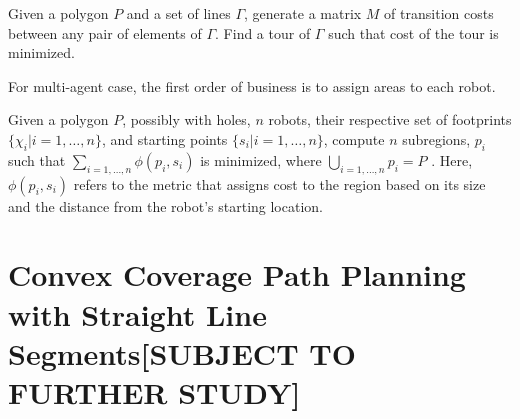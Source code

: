 \documentclass[../main.tex]{subfiles}
\begin{document}
\begin{problem}
\label{prob:min_tour}
	
Given a polygon $P$ and a set of lines $\Gamma$, generate a matrix $M$ of transition costs between any pair of elements of $\Gamma$. Find a tour of $\Gamma$ such that cost of the tour is minimized.
\end{problem}


For multi-agent case, the first order of business is to assign areas to each robot.
\begin{problem}
\label{prb:distr_cpp_2}

Given a polygon $P$, possibly with holes, $n$ robots, their respective set of footprints $\{\chi_i|i=1,\ldots,n\}$, and starting points $\{s_i|i=1,\ldots,n\}$, compute $n$ subregions, $p_i$ such that $\sum_{i=1,\ldots,n}\phi(p_i,s_i)$ is minimized, where $\bigcup_{i=1,\ldots,n} p_i=P$ . Here, $\phi(p_i,s_i)$ refers to the metric that assigns cost to the region based on its size and the distance from the robot's starting location.
\end{problem}



\section{Convex Coverage Path Planning with Straight Line Segments[SUBJECT TO FURTHER STUDY]}
\label{sec:convex_cpp_with_lines}
\end{document}
